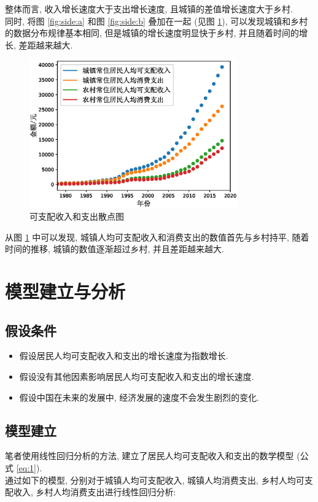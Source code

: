 \documentclass{article}
\begin{document}
\indent 整体而言, 收入增长速度大于支出增长速度, 且城镇的差值增长速度大于乡村.\\
\indent 同时, 将图 \ref{fig:side:a} 和图 \ref{fig:side:b} 叠加在一起 (见图 \ref{fig:side:c}), 可以发现城镇和乡村的数据分布规律基本相同, 但是城镇的增长速度明显快于乡村, 并且随着时间的增长, 差距越来越大.\\
\begin{figure}[H]
  \centering
  \includegraphics[width=0.8\textwidth]{figures/plot1.eps}
  \caption{可支配收入和支出散点图}
  \label{fig:side:c}
\end{figure}
从图 \ref{fig:side:c} 中可以发现, 城镇人均可支配收入和消费支出的数值首先与乡村持平, 随着时间的推移, 城镇的数值逐渐超过乡村, 并且差距越来越大.\\
\section{模型建立与分析}\label{sec:model}

\subsection{假设条件}

\begin{itemize}
  \item 假设居民人均可支配收入和支出的增长速度为指数增长.
  \item 假设没有其他因素影响居民人均可支配收入和支出的增长速度.
  \item 假设中国在未来的发展中, 经济发展的速度不会发生剧烈的变化.
\end{itemize}

\subsection{模型建立}
笔者使用线性回归分析的方法, 建立了居民人均可支配收入和支出的数学模型 (公式 \ref{eq:1}).\\
\indent 通过如下的模型, 分别对于城镇人均可支配收入, 城镇人均消费支出, 乡村人均可支配收入, 乡村人均消费支出进行线性回归分析:
\end{document}
